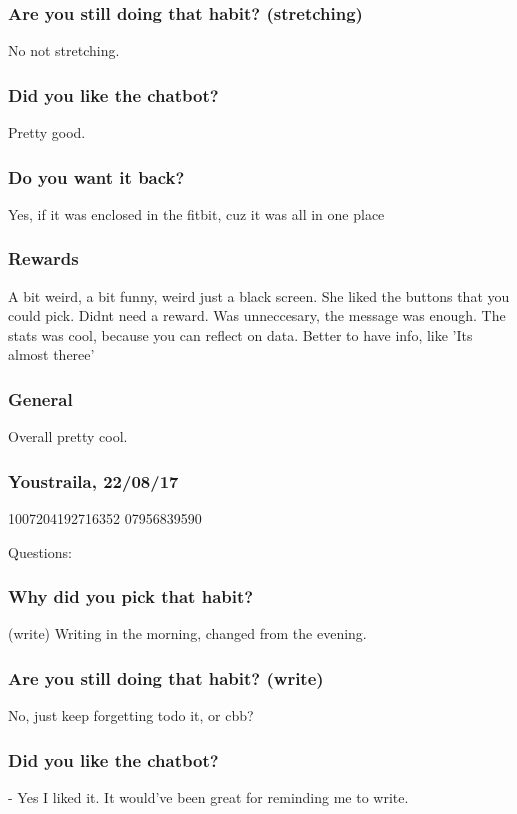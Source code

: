 \documentclass{scaffold/sigchi}
\begin{document}
\subsubsection{Are you still doing that habit? (stretching)}
No not stretching.

\subsubsection{Did you like the chatbot?}
Pretty good.

\subsubsection{Do you want it back?}
Yes, if it was enclosed in the fitbit, cuz it was all in one place

\subsubsection{Rewards}
A bit weird, a bit funny, weird just a black screen. She liked the buttons that you could pick.
Didnt need a reward. Was unneccesary, the message was enough. The stats was cool, because you can reflect on data. Better to have info, like 'Its almost theree'

\subsubsection{General}
Overall pretty cool.


\subsubsection{Youstraila, 22/08/17}
1007204192716352 07956839590

Questions:

\subsubsection{Why did you pick that habit?} (write)
Writing in the morning, changed from the evening.

\subsubsection{Are you still doing that habit? (write)}
No, just keep forgetting todo it, or cbb?

\subsubsection{Did you like the chatbot?}
- Yes I liked it. It would've been great for reminding me to write.
\end{document}
